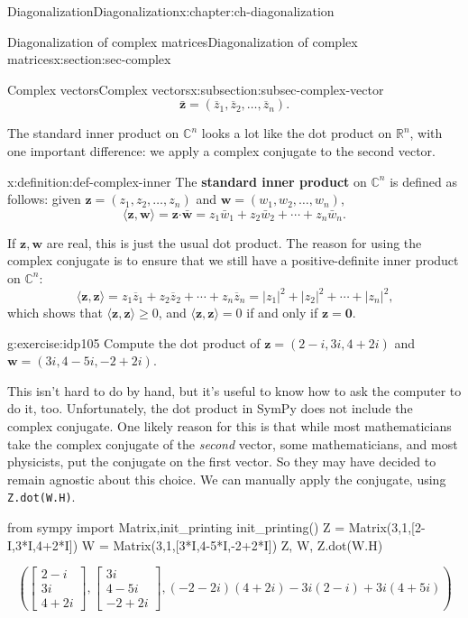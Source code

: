 \documentclass[oneside,10pt,]{book}
\newcommand{\mono}[1]{\texttt{#1}}
\newcommand{\terminology}[1]{\textbf{#1}}
\numberwithin{equation}{section}
\newcommand{\bbm}{\begin{bmatrix}}
\newcommand{\ebm}{\end{bmatrix}}
\newcommand{\R}{\mathbb{R}}
\newcommand{\C}{\mathbb{C}}
\newcommand{\dotp}{\!\boldsymbol{\cdot}\!}
\newcommand{\abs}[1]{\lvert #1\rvert}
\newcommand{\bz}{\overline{z}}
\newcommand{\zz}{\mathbf{z}}
\newcommand{\ww}{\mathbf{w}}
\begin{document}
\begin{chapterptx}{Diagonalization}{}{Diagonalization}{}{}{x:chapter:ch-diagonalization}
\begin{sectionptx}{Diagonalization of complex matrices}{}{Diagonalization of complex matrices}{}{}{x:section:sec-complex}
\begin{subsectionptx}{Complex vectors}{}{Complex vectors}{}{}{x:subsection:subsec-complex-vector}
\begin{equation*}
\bar{\zz} = (\bz_1,\bz_2,\ldots, \bz_n)\text{.}
\end{equation*}
%
\par
The standard inner product on \(\C^n\) looks a lot like the dot product on \(\R^n\), with one important difference: we apply a complex conjugate to the second vector.%
\begin{definition}{}{x:definition:def-complex-inner}%
The \terminology{standard inner product} on \(\C^n\) is defined as follows: given \(\zz=(z_1,z_2,\ldots, z_n)\) and \(\ww=(w_1,w_2,\ldots, w_n)\),%
\begin{equation*}
\langle \zz,\ww\rangle = \zz\dotp\bar{\ww} = z_1\bar{w}_1+z_2\bar{w}_2+\cdots + z_n\bar{w}_n\text{.}
\end{equation*}
%
\end{definition}
If \(\zz,\ww\) are real, this is just the usual dot product. The reason for using the complex conjugate is to ensure that we still have a positive-definite inner product on \(\C^n\):%
\begin{equation*}
\langle \zz,\zz\rangle = z_1\bz_1+z_2\bz_2+\cdots + z_n\bz_n = \abs{z_1}^2+\abs{z_2}^2+\cdots + \abs{z_n}^2\text{,}
\end{equation*}
which shows that \(\langle \zz,\zz\rangle \geq 0\), and \(\langle \zz,\zz\rangle = 0\) if and only if \(\zz=\mathbf{0}\).%
\begin{inlineexercise}{}{g:exercise:idp105}%
Compute the dot product of \(\zz = (2-i, 3i, 4+2i)\) and \(\ww = (3i,4-5i,-2+2i)\).%
\end{inlineexercise}%
This isn't hard to do by hand, but it's useful to know how to ask the computer to do it, too. Unfortunately, the dot product in SymPy does not include the complex conjugate. One likely reason for this is that while most mathematicians take the complex conjugate of the \emph{second} vector, some mathematicians, and most physicists, put the conjugate on the first vector. So they may have decided to remain agnostic about this choice. We can manually apply the conjugate, using \mono{Z.dot(W.H)}.%
\begin{sageinput}
from sympy import Matrix,init_printing
init_printing()
Z = Matrix(3,1,[2-I,3*I,4+2*I])
W = Matrix(3,1,[3*I,4-5*I,-2+2*I])
Z, W, Z.dot(W.H)
\end{sageinput}
\begin{sageoutput}
\[\left(\bbm 2-i\\3i\\4+2i\ebm, \bbm 3i\\4-5i\\-2+2i\ebm, (-2-2i)(4+2i)-3i(2-i)+3i(4+5i)\right)\]

\end{sageoutput}
\end{subsectionptx}
\end{sectionptx}
\end{chapterptx}
\end{document}
